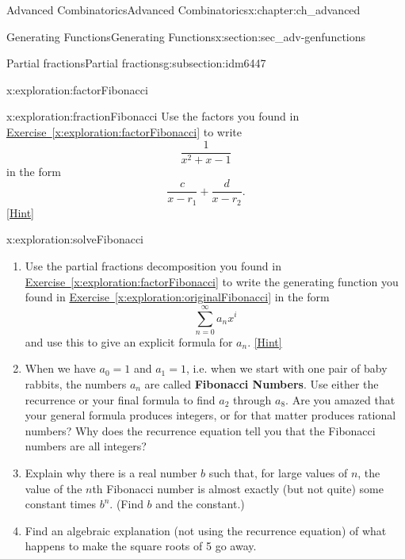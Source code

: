 \documentclass[oneside,10pt,]{book}
\newcommand{\terminology}[1]{\textbf{#1}}
\numberwithin{equation}{chapter}
\begin{document}
\begin{chapterptx}{Advanced Combinatorics}{}{Advanced Combinatorics}{}{}{x:chapter:ch_advanced}
\begin{sectionptx}{Generating Functions}{}{Generating Functions}{}{}{x:section:sec_adv-genfunctions}
\begin{subsectionptx}{Partial fractions}{}{Partial fractions}{}{}{g:subsection:idm6447}
\begin{exploration}{}{x:exploration:factorFibonacci}
\end{exploration}
\begin{exploration}{}{x:exploration:fractionFibonacci}%
Use the factors you found in \hyperref[x:exploration:factorFibonacci]{Exercise~\ref{x:exploration:factorFibonacci}} to write%
\begin{equation*}
\frac{1}{x^2+x-1}
\end{equation*}
in the form%
\begin{equation*}
\frac{c}{x-r_1} + \frac{d}{x-r_2}.
\end{equation*}
%
\space\hspace*{0pt}\hfill{\tiny\hyperlink{g:hint:idm6592-back}{[Hint]}}\end{exploration}
%
\begin{exploration}{}{x:exploration:solveFibonacci}%
\begin{enumerate}[font=\bfseries,label=(\alph*),ref=\alph*]
\item{}Use the partial fractions decomposition you found in \hyperref[x:exploration:factorFibonacci]{Exercise~\ref{x:exploration:factorFibonacci}} to write the generating function you found in \hyperref[x:exploration:originalFibonacci]{Exercise~\ref{x:exploration:originalFibonacci}} in the form%
\begin{equation*}
\sum_{n=0}^\infty a_nx^i
\end{equation*}
and use this to give an explicit formula for \(a_n\).%
\space\hspace*{0pt}\hfill{\tiny\hyperlink{g:hint:idm6618-back}{[Hint]}}\item{}When we have \(a_0=1\) and \(a_1=1\), i.e. when we start with one pair of baby rabbits, the numbers \(a_n\) are called \terminology{Fibonacci Numbers}.  Use either the recurrence or your final formula to find \(a_2\) through \(a_8\).  Are you amazed that your general formula produces integers, or for that matter produces rational numbers?  Why does the recurrence equation tell you that the Fibonacci numbers are all integers?%
\item{}Explain why there is a real number \(b\) such that, for large values of \(n\), the value of the \(n\)th Fibonacci number is almost exactly (but not quite) some constant times \(b^n\). (Find \(b\) and the constant.)%
\item{}Find an algebraic explanation (not using the recurrence equation) of what happens to make the square roots of 5 go away.%

\end{enumerate}
\end{exploration}
\end{subsectionptx}
\end{sectionptx}
\end{chapterptx}
\end{document}
